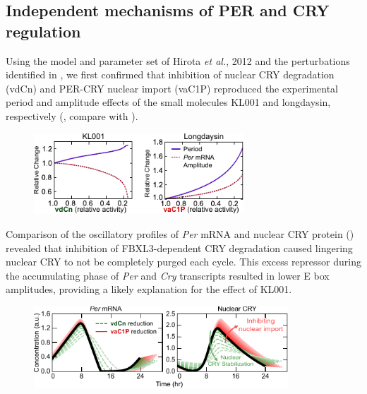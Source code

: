 \subsection{Independent mechanisms of PER and CRY regulation}
Using the model and parameter set of Hirota {\it et al.}, 2012 \cite{Hirota2012} and the perturbations identified in , we first confirmed that inhibition of nuclear CRY degradation (vdCn) and PER-CRY nuclear import (vaC1P) reproduced the experimental period and amplitude effects of the small molecules KL001 and longdaysin, respectively (, compare with ). 

\begin{figure}[h]
  \centering
  \includegraphics[width=0.7\textwidth]{chap4/figures/fig4a.pdf}
  \label{fig:44a}
\end{figure}

Comparison of the oscillatory profiles of {\it Per} mRNA and nuclear CRY protein () revealed that inhibition of FBXL3-dependent CRY degradation caused lingering nuclear CRY to not be completely purged each cycle. 
 This excess repressor during the accumulating phase of {\it Per} and {\it Cry} transcripts resulted in lower E box amplitudes, providing a likely explanation for the effect of KL001.

\begin{figure}[h]
  \centering
  \includegraphics[width=0.85\textwidth]{chap4/figures/fig4b.pdf}
  \label{fig:44b}
\end{figure}

